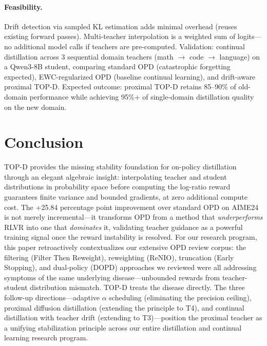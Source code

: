 \documentclass[11pt,a4paper]{article}
\begin{document}
\paragraph{Feasibility.} Drift detection via sampled KL estimation adds minimal overhead (reuses existing forward passes). Multi-teacher interpolation is a weighted sum of logits---no additional model calls if teachers are pre-computed. Validation: continual distillation across 3 sequential domain teachers (math $\to$ code $\to$ language) on a Qwen3-8B student, comparing standard OPD (catastrophic forgetting expected), EWC-regularized OPD (baseline continual learning), and drift-aware proximal TOP-D. Expected outcome: proximal TOP-D retains 85--90\% of old-domain performance while achieving 95\%+ of single-domain distillation quality on the new domain.

\section{Conclusion}

TOP-D provides the missing stability foundation for on-policy distillation through an elegant algebraic insight: interpolating teacher and student distributions in probability space before computing the log-ratio reward guarantees finite variance and bounded gradients, at zero additional compute cost. The +25.84 percentage point improvement over standard OPD on AIME24 is not merely incremental---it transforms OPD from a method that \emph{underperforms} RLVR into one that \emph{dominates} it, validating teacher guidance as a powerful training signal once the reward instability is resolved. For our research program, this paper retroactively contextualizes our extensive OPD review corpus: the filtering (Filter Then Reweight), reweighting (ReNIO), truncation (Early Stopping), and dual-policy (DOPD) approaches we reviewed were all addressing symptoms of the same underlying disease---unbounded rewards from teacher-student distribution mismatch. TOP-D treats the disease directly. The three follow-up directions---adaptive $\alpha$ scheduling (eliminating the precision ceiling), proximal diffusion distillation (extending the principle to T4), and continual distillation with teacher drift (extending to T3)---position the proximal teacher as a unifying stabilization principle across our entire distillation and continual learning research program.
\end{document}
